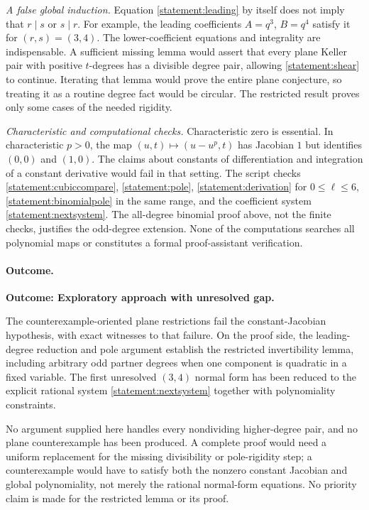\documentclass[11pt]{article}
\begin{document}
\emph{A false global induction.}
Equation \eqref{statement:leading} by itself does not imply that $r\mid s$ or
$s\mid r$. For example, the leading coefficients $A=q^3$, $B=q^4$
satisfy it for $(r,s)=(3,4)$. The lower-coefficient equations and integrality
are indispensable. A sufficient missing lemma would assert that every plane
Keller pair with positive $t$-degrees has a divisible degree pair, allowing
\eqref{statement:shear} to continue. Iterating that lemma would prove the entire
plane conjecture, so treating it as a routine degree fact would be circular.
The restricted result proves only some cases of the needed rigidity.

\emph{Characteristic and computational checks.}
Characteristic zero is essential. In characteristic $p>0$, the map
$(u,t)\mapsto(u-u^p,t)$ has Jacobian $1$ but identifies $(0,0)$ and $(1,0)$.
The claims about constants of differentiation and integration of a constant
derivative would fail in that setting. The script checks
\eqref{statement:cubiccompare}, \eqref{statement:pole},
\eqref{statement:derivation} for $0\le\ell\le6$,
\eqref{statement:binomialpole} in the same range, and the coefficient system
\eqref{statement:nextsystem}. The all-degree binomial proof above, not the finite
checks, justifies the odd-degree extension. None of the computations searches
all polynomial maps or constitutes a formal proof-assistant verification.

\paragraph{Outcome.}
\textbf{Outcome: Exploratory approach with unresolved gap.}

The counterexample-oriented plane restrictions fail the constant-Jacobian
hypothesis, with exact witnesses to that failure. On the proof side, the
leading-degree reduction and pole argument establish the restricted
invertibility lemma, including arbitrary odd partner degrees when one
component is quadratic in a fixed variable. The first unresolved $(3,4)$
normal form has been reduced to the explicit rational system
\eqref{statement:nextsystem} together with polynomiality constraints.

No argument supplied here handles every nondividing higher-degree pair, and
no plane counterexample has been produced. A complete proof would need a
uniform replacement for the missing divisibility or pole-rigidity step; a
counterexample would have to satisfy both the nonzero constant Jacobian and
global polynomiality, not merely the rational normal-form equations. No
priority claim is made for the restricted lemma or its proof.
\end{document}

